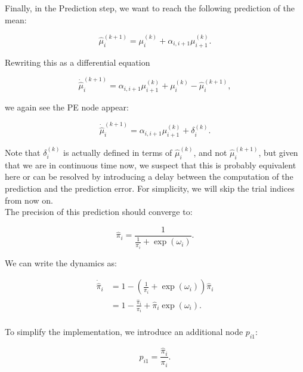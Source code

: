 Finally, in the \textsf{Prediction} step, we want to reach the following prediction of the mean:

\begin{equation}
	\hat{\mu}_i^{(k+1)} = \mu_i^{(k)} + \alpha_{i,i+1} \mu_{i+1}^{(k)}.
\end{equation}

Rewriting this as a differential equation

\begin{equation}
	\dot{\hat{\mu}}_i^{(k+1)} = \alpha_{i,i+1} \mu_{i+1}^{(k)} + \mu_i^{(k)} - \hat{\mu}_i^{(k+1)}, 
\end{equation}

we again see the \textsf{PE} node appear:

\begin{equation}
	\dot{\hat{\mu}}_i^{(k+1)} = \alpha_{i,i+1} \mu_{i+1}^{(k)} + \delta_i^{(k)}. 
\end{equation}

Note that $\delta_i^{(k)}$ is actually defined in terms of $\hat{\mu}_i^{(k)}$, and not $\hat{\mu}_i^{(k+1)}$, but given that we are in continuous time now, we suspect that this is probably equivalent here or can be resolved by introducing a delay between the computation of the prediction and the prediction error. For simplicity, we will skip the trial indices from now on. \\

The precision of this prediction should converge to:

\begin{equation}
	\hat{\pi}_i = \frac{1}{\frac{1}{\pi_i} + \exp(\omega_i)}.
\end{equation}

We can write the dynamics as:

\begin{equation}
	\begin{split}
		\dot{\hat{\pi}}_i &= 1 - (\frac{1}{\pi_i} + \exp(\omega_i)) \hat{\pi}_i\\
		&= 1 - \frac{\hat{\pi}_i}{\pi_i} + \hat{\pi}_i \exp(\omega_i).\\
	\end{split}
\end{equation}

To simplify the implementation, we introduce an additional node $p_{i1}$:

\begin{equation}
	p_{i1} = \frac{\hat{\pi}_i}{\pi_i}.
\end{equation}

